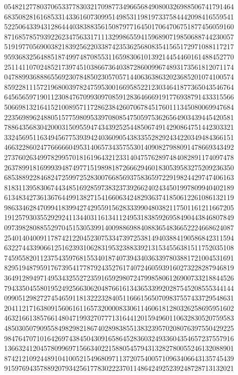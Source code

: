 {{    0548212778037065337783032170987734966568490800326988506741791464 ~
    6835082816168533143361607309951498531198197337584442098416559541 ~
    5225064339431286444038388356150879771645017064706751877456059160 ~
    8716857857939226234756331711132998655941596890719850688744230057 ~
    5191977056900382183925622033874235362568083541565172971088117217 ~
    9593683256488518749974870855311659830610139214454460161488452770 ~
    2511411070248521739745103866736403872860099674893173561812071174 ~
    0478899368886556923078485023057057144063638632023685201074100574 ~
    8592281115721968003978247595300166958522123034641877365043546764 ~
    6456565971901123084767099309708591283646669191776938791433315566 ~
    5066981321641521008957117286238426070678451760111345080069947684 ~
    2235698962488051577598095339708085475059753626564903439445420581 ~
    7886435683042000315095594743439252544850674914290864751442303321 ~
    3324569511634945677539394240360905438335528292434220349484366151 ~
    4663228602477666660495314065734357553014090827988091478669343492 ~
    2737602634997829957018161964321233140475762897484082891174097478 ~
    2637899181699939487497715198981872666294601830539583275209236350 ~
    6853889228468247259972528300766856937583659722919824429747406163 ~
    8183113958306744348516928597383237392662402434501997809940402189 ~
    6134834273613676449913827154166063424829363741850612261086132119 ~
    9863346284709941839942742955915628333990480382117501161211667205 ~
    1912579303552929241134403116134112495318385926958490443846807849 ~
    0973982808855297045153053991400988698840883654836652224668624087 ~
    2540140400911787421220452307533473972538149403884190586842311594 ~
    6322744339066125162393106283195323883392131534556381511752035108 ~
    7459558201123754359768155340187407394340363397803881721004531691 ~
    8295194879591767395417787924352761740724605939160273228287946819 ~
    3649128949714953432552723591659298072479985806126900733218844526 ~
    7943350455801952492566306204876616134365339920287545208555344144 ~
    0990512982727454659118132223284051166615650709837557433729548631 ~
    2041121716380915606161165732000083306114606181280326258695951602 ~
    4632166138576614804719932707771316441201594960110632830520759583 ~
    4850305079095584982982186740289838551383239570208076397550429225 ~
    9847647071016426974384504309165864528360324933604354657237557916 ~
    1366324120457809969715663402215880545794313282780055246132088901 ~
    8742121092448910410052154968097113720754005710963406643135745439 ~
    9159769435788920793425617783022237011486424925239248728713132021 ~
}}
